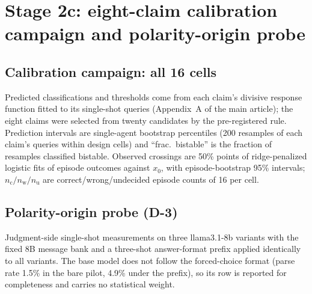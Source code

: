 \documentclass[11pt]{article}
\begin{document}
\section{Stage 2c: eight-claim calibration campaign and polarity-origin probe}

\subsection{Calibration campaign: all 16 cells}

Predicted classifications and thresholds come from each claim's divisive
response function fitted to its single-shot queries (Appendix~A of the main article); the eight
claims were selected from twenty candidates by the pre-registered rule.
Prediction intervals are single-agent bootstrap percentiles (200 resamples
of each claim's queries within design cells) and ``frac.\ bistable'' is the
fraction of resamples classified bistable. Observed crossings are 50\% points
of ridge-penalized logistic fits of episode outcomes against $x_0$, with
episode-bootstrap 95\% intervals;
$n_{\mathrm{c}}/n_{\mathrm{w}}/n_{\mathrm{u}}$ are correct/wrong/undecided
episode counts of 16 per cell.

\begin{table}[h]
\centering\footnotesize
\resizebox{\textwidth}{!}{}
\caption{All 16 cells of the eight-claim calibration campaign (qwen3:8b,
256 episodes, zero parse failures). Fifteen cells match in class; the
mismatch is claim 1146 at $\alpha = 0.30$, predicted bistable with threshold
0.094 just above the lowest seeded fraction (2/32), observed monostable
correct. All eleven predicted thresholds of the cells observed bistable lie
inside the observed intervals (mean absolute difference 0.04; Spearman
$r_s = 0.96$, claim-permutation $p = 0.004$).}
\end{table}

\subsection{Polarity-origin probe (D-3)}

Judgment-side single-shot measurements on three llama3.1-8b variants with the
fixed 8B message bank and a three-shot answer-format prefix applied
identically to all variants. The base model does not follow the forced-choice
format (parse rate 1.5\% in the bare pilot, 4.9\% under the prefix), so its row is
reported for completeness and carries no statistical weight.
\end{document}
